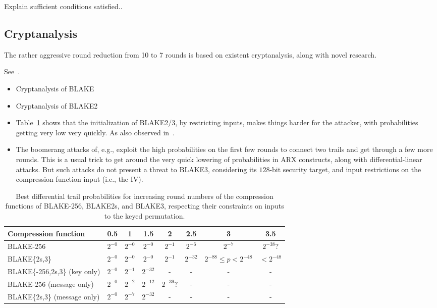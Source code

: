 \documentclass[12pt,notitlepage,a4paper]{article}
\begin{document}
Explain sufficient conditions satisfied..

\subsection{Cryptanalysis}\label{sec:cryptanalysis}

The rather aggressive round reduction from 10 to 7 rounds is based on existent cryptanalysis, along with novel research.

See~\cite{TMC}.

\begin{itemize}
  \item Cryptanalysis of BLAKE~\cite{DBLP:conf/cans/SuWWD10,DBLP:journals/ipl/VidaliNP10,DBLP:journals/iet-ifs/BaiYWW15,DBLP:conf/fse/AumassonGKMM10,DBLP:journals/iacr/JiL09,DK11,DBLP:conf/fse/BiryukovNR11}
  \item Cryptanalysis of BLAKE2~\cite{DBLP:conf/ctrsa/0001KNWW14,DBLP:conf/cisc/Hao14,DBLP:conf/crypto/EspitauFK15}
  \item Table~\ref{tab:trails} shows that the initialization of BLAKE2/3, by restricting inputs, makes things harder for the attacker, with probabilities getting very low very quickly. As also observed in~\cite[\S7]{DBLP:conf/ctrsa/0001KNWW14}. 
  \item The boomerang attacks of, e.g., \cite{DBLP:conf/cisc/Hao14,DBLP:conf/fse/BiryukovNR11,DBLP:journals/iet-ifs/BaiYWW15} exploit the high probabilities on the first few rounds to connect two trails and get through a few more rounds. This is a usual trick to get around the very quick lowering of probabilities in ARX constructs, along with differential-linear attacks. But such attacks do not present a threat to BLAKE3, considering its $128$-bit security target, and input restrictions on the compression function input (i.e., the IV).
\end{itemize}

\begin{table}
\centering
\caption{Best differential trail probabilities for increasing round numbers of the compression functions of BLAKE-256, BLAKE2s, and BLAKE3, respecting their constraints on inputs to the keyed permutation.}%
\label{tab:trails}
\begin{tabular}{lccccccc}
  \toprule
  Compression function & 0.5   & 1     & 1.5   & 2     & 2.5   & 3     & 3.5 \\ \midrule
  BLAKE-256 & $2^{-0}$ & $2^{-0}$ & $2^{-0}$ & $2^{-1}$ & $2^{-6}$ & $2^{-7}$ & $2^{-38}?$  \\
  BLAKE\{2s,3\}   &  $2^{-0}$  & $2^{-0}$ &  $2^{-0}$  & $2^{-1}$ & $2^{-32}$   & $2^{-88} \le p<2^{-48}$ & $<2^{-48}$  \\
  BLAKE\{-256,2s,3\} (key only) & $2^{-0}$ & $2^{-1}$ & $2^{-32}$ & - & - & - & -  \\
  BLAKE-256 (message only) & $2^{-0}$ & $2^{-2}$ & $2^{-12}$ & $2^{-39}?$ & - & - & - \\
  BLAKE\{2s,3\} (message only) & $2^{-0}$ & $2^{-7}$ & $2^{-32}$ & - & - & - & - \\
  \bottomrule
\end{tabular}
\end{table}
\end{document}
